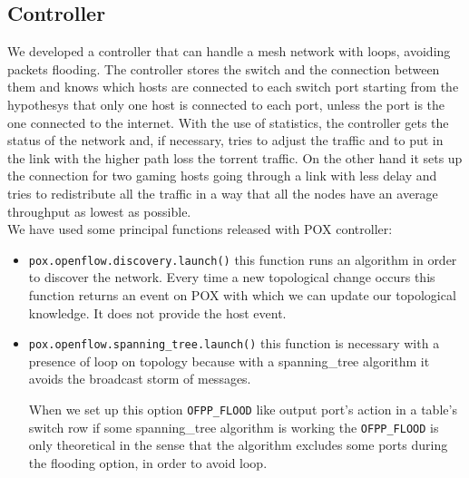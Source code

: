 \documentclass[article,10pt]{IEEEtran}
\begin{document}
\subsection{Controller}
We developed a controller that can handle a mesh network with loops, avoiding
packets flooding. The controller stores the switch and the connection between them and knows which hosts are connected to each switch port starting from the hypothesys that only one
host is connected to each port, unless the port is the one connected to the internet.
With the use of statistics, the controller gets the status of the network and, if necessary,
tries to adjust the traffic and to put in the link with the higher path loss the torrent traffic.
On the other hand it sets up the connection for two gaming hosts going through a link with less delay and tries to redistribute all the 
traffic in a way that all the nodes have an average throughput as lowest as possible.
\\
\newline
We have used some principal functions released with POX controller:
\begin{itemize}
 \item \texttt{pox.openflow.discovery.launch()} this function runs an algorithm in order to discover the network. Every time a new
 topological change occurs this function returns an event on POX with which we can update our topological knowledge.
 It does not provide the host event\cite{pox}.
 \item \texttt{pox.openflow.spanning_tree.launch()} this function is necessary with a presence of loop on topology
 because with a spanning_tree algorithm it avoids the broadcast storm of messages.
 
When we set up this option \texttt{OFPP_FLOOD} like output port's action in a table's switch row if some spanning_tree algorithm is working
the \texttt{OFPP_FLOOD} is only theoretical in the sense that the algorithm excludes some ports during the flooding option, in order to avoid loop\cite{pox}.
\end{itemize}
\end{document}
